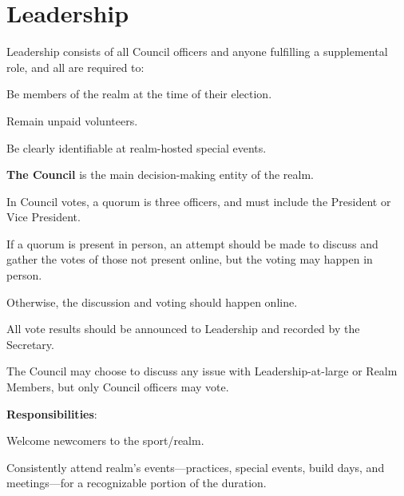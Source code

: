 \documentclass[12pt]{article}
\begin{document}
\section{Leadership}\label{leadership}
\begin{level}
    \item Leadership consists of all Council officers and anyone fulfilling a supplemental role, and all are required to:
    \begin{level}
        \item Be members of the realm at the time of their election.
        \item Remain unpaid volunteers.
        \item Be clearly identifiable at realm-hosted special events.
    \end{level}
    \item \textbf{The Council} is the main decision-making entity of the realm.\label{the_council}
    \begin{level}
        \item {}
        \begin{level}
            \item In Council votes, a quorum is three officers, and must include the President or Vice President. 
            \item If a quorum is present in person, an attempt should be made to discuss and gather the votes of those not present online, but the voting may happen in person.
            \begin{level}
                \item Otherwise, the discussion and voting should happen online.
            \end{level}
            \item All vote results should be announced to Leadership and recorded by the Secretary.
            \item The Council may choose to discuss any issue with Leadership-at-large or Realm Members, but only Council officers may vote.
        \end{level}
        \item \textbf{Responsibilities}:
        \begin{level}
            \item Welcome newcomers to the sport/realm.
            \item Consistently attend realm's events---practices, special events, build days, and meetings---for a recognizable portion of the duration. 

\end{level}
\end{level}
\end{level}
\end{document}
